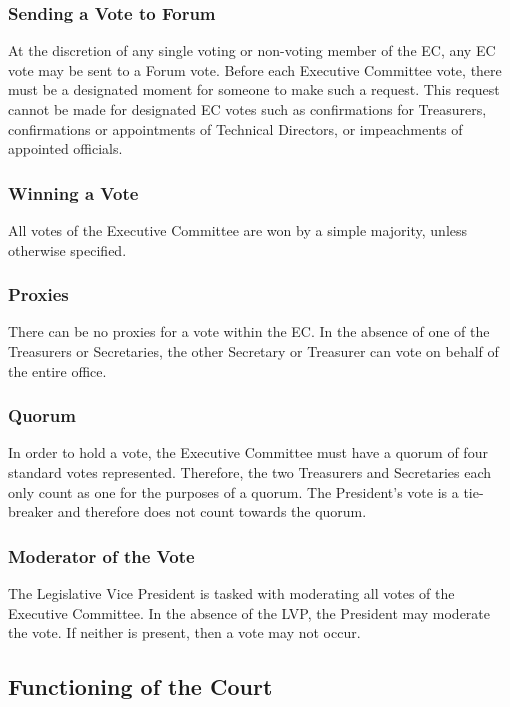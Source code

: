 \documentclass[USletter,12pt]{article}
\begin{document}
\subsubsection{Sending a Vote to Forum}
At the discretion of any single voting or non-voting member of the EC, any EC vote may be sent to a Forum vote.  Before each Executive Committee vote, there must be a designated moment for someone to make such a request.  This request cannot be made for designated EC votes such as confirmations for Treasurers, confirmations or appointments of Technical Directors, or impeachments of appointed officials.

\subsubsection{Winning a Vote}
All votes of the Executive Committee are won by a simple majority, unless otherwise specified.

\subsubsection{Proxies}
There can be no proxies for a vote within the EC.  In the absence of one of the Treasurers or Secretaries, the other Secretary or Treasurer can vote on behalf of the entire office.

\subsubsection{Quorum}
In order to hold a vote, the Executive Committee must have a quorum of four standard votes represented.  Therefore, the two Treasurers and Secretaries each only count as one for the purposes of a quorum.  The President's vote is a tie-breaker and therefore does not count towards the quorum.

\subsubsection{Moderator of the Vote}
The Legislative Vice President is tasked with moderating all votes of the Executive Committee.  In the absence of the LVP, the President may moderate the vote.  If neither is present, then a vote may not occur.


\subsection{Functioning of the Court}
\end{document}
